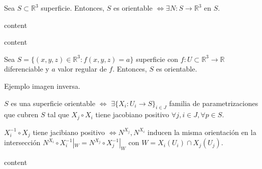 \begin{prop}
  Sea $S \subset \mathbb{R}^{3}$ superficie. Entonces, $S$ es orientable $\Leftrightarrow \exists N : S \to \mathbb{R}^{3}$ en $S$.
\end{prop}

\begin{dem}
  content
\end{dem}

\begin{ejm}
  content
\end{ejm}

\begin{prop}
  Sea $S = \{ (x, y, z) \in \mathbb{R}^{3} : f(x, y, z) = a \}$ superficie con $f : U \subset \mathbb{R}^{3} \to \mathbb{R}$ diferenciable y $a$ valor regular de $f$. Entonces, $S$ es orientable.
\end{prop}

\begin{dem}
  Ejemplo imagen inversa.
\end{dem}

\begin{theo}
  $S$ es una superficie orientable $\Leftrightarrow $ $\exists \{ X_{i} : U_{i} \to S  \}_{i \in J}$ familia de parametrizaciones que cubren $S$ tal que $X_{j} \circ X_{i}$ tiene jacobiano positivo $\forall j, i \in J, \forall p \in S$.
\end{theo}

\begin{lem}
  $X_{i}^{-1} \circ X_{j}$ tiene jacibiano positivo $\Leftrightarrow N^{X_{j}}, N^{X_{i}}$ inducen la misma orientación en la intersección $N^{X_{i}} \circ X_{i}^{-1}|_{W} = N^{X_{j}} \circ X_{j}^{-1}|_{W}$ con $W  = X_{i}(U_{i}) \cap X_{j}(U_{j})$.
\end{lem}

\begin{dem}
  content
\end{dem}
